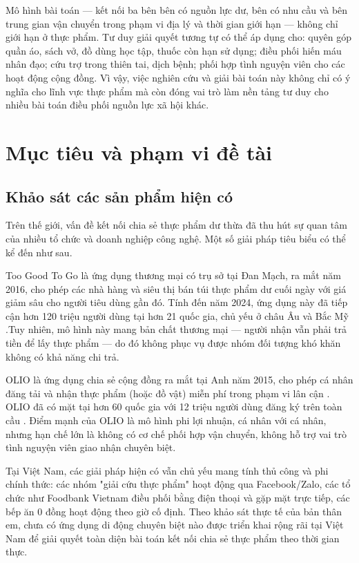 \documentclass[../main.tex]{subfiles}%
\begin{document}
Mô hình bài toán — kết nối ba bên bên có nguồn lực dư, bên có nhu cầu và bên trung gian vận chuyển trong phạm vi địa lý và thời gian giới hạn — không chỉ giới hạn ở thực phẩm. Tư duy giải quyết tương tự có thể áp dụng cho: quyên góp quần áo, sách vở, đồ dùng học tập, thuốc còn hạn sử dụng; điều phối hiến máu nhân đạo; cứu trợ trong thiên tai, dịch bệnh; phối hợp tình nguyện viên cho các hoạt động cộng đồng. Vì vậy, việc nghiên cứu và giải bài toán này không chỉ có ý nghĩa cho lĩnh vực thực phẩm mà còn đóng vai trò làm nền tảng tư duy cho nhiều bài toán điều phối nguồn lực xã hội khác.

\section{Mục tiêu và phạm vi đề tài}%
\label{section:1.2}

\subsection{Khảo sát các sản phẩm hiện có}
\label{subsection:1.2.1}
Trên thế giới, vấn đề kết nối chia sẻ thực phẩm dư thừa đã thu hút sự quan tâm của nhiều tổ chức và doanh nghiệp công nghệ. Một số giải pháp tiêu biểu có thể kể đến như sau. 

Too Good To Go là ứng dụng thương mại có trụ sở tại Đan Mạch, ra mắt năm 2016, cho phép các nhà hàng và siêu thị bán túi thực phẩm dư cuối ngày với giá giảm sâu cho người tiêu dùng gần đó. Tính đến năm 2024, ứng dụng này đã tiếp cận hơn 120 triệu người dùng tại hơn 21 quốc gia, chủ yếu ở châu Âu và Bắc Mỹ \cite{TooGoodToGo} .Tuy nhiên, mô hình này mang bản chất thương mại — người nhận vẫn phải trả tiền để lấy thực phẩm — do đó không phục vụ được nhóm đối tượng khó khăn không có khả năng chi trả.

OLIO là ứng dụng chia sẻ cộng đồng ra mắt tại Anh năm 2015, cho phép cá nhân đăng tải và nhận thực phẩm (hoặc đồ vật) miễn phí trong phạm vi lân cận \cite{Olio}. OLIO đã có mặt tại hơn 60 quốc gia với 12 triệu người dùng đăng ký trên toàn cầu \cite{Olio}. Điểm mạnh của OLIO là mô hình phi lợi nhuận, cá nhân với cá nhân, nhưng hạn chế lớn là không có cơ chế phối hợp vận chuyển, không hỗ trợ vai trò tình nguyện viên giao nhận chuyên biệt.

Tại Việt Nam, các giải pháp hiện có vẫn chủ yếu mang tính thủ công và phi chính thức: các nhóm "giải cứu thực phẩm" hoạt động qua Facebook/Zalo, các tổ chức như Foodbank Vietnam điều phối bằng điện thoại và gặp mặt trực tiếp, các bếp ăn 0 đồng hoạt động theo giờ cố định. Theo khảo sát thực tế của bản thân em, chưa có ứng dụng di động chuyên biệt nào được triển khai rộng rãi tại Việt Nam để giải quyết toàn diện bài toán kết nối chia sẻ thực phẩm theo thời gian thực.
\end{document}
